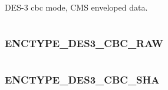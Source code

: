 \documentclass[letterpaper,10pt,english]{sphinxmanual}
\begin{document}
\begin{fulllineitems}
\label{appdev/refs/macros/ENCTYPE_DES3_CBC_ENV:ENCTYPE_DES3_CBC_ENV}
\end{fulllineitems}


DES-3 cbc mode, CMS enveloped data.

\begin{tabulary}{\linewidth}{|L|L|}
\hline

 & 
\\
\hline\end{tabulary}



\subsubsection{ENCTYPE\_DES3\_CBC\_RAW}
\label{appdev/refs/macros/ENCTYPE_DES3_CBC_RAW:enctype-des3-cbc-raw}\label{appdev/refs/macros/ENCTYPE_DES3_CBC_RAW::doc}\label{appdev/refs/macros/ENCTYPE_DES3_CBC_RAW:enctype-des3-cbc-raw-data}

\begin{fulllineitems}
\label{appdev/refs/macros/ENCTYPE_DES3_CBC_RAW:ENCTYPE_DES3_CBC_RAW}
\end{fulllineitems}


\begin{tabulary}{\linewidth}{|L|L|}
\hline

 & 
\\
\hline\end{tabulary}



\subsubsection{ENCTYPE\_DES3\_CBC\_SHA}
\label{appdev/refs/macros/ENCTYPE_DES3_CBC_SHA:enctype-des3-cbc-sha}\label{appdev/refs/macros/ENCTYPE_DES3_CBC_SHA::doc}\label{appdev/refs/macros/ENCTYPE_DES3_CBC_SHA:enctype-des3-cbc-sha-data}

\begin{fulllineitems}
\label{appdev/refs/macros/ENCTYPE_DES3_CBC_SHA:ENCTYPE_DES3_CBC_SHA}
\end{fulllineitems}
\end{document}
